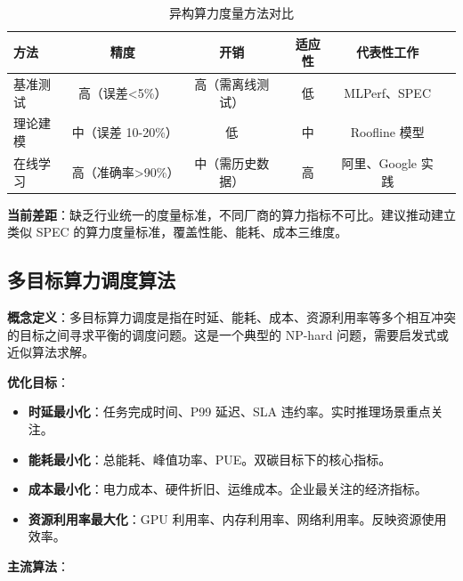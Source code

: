 \documentclass[12pt,a4paper]{article}
\begin{document}
\begin{table}[h]
\centering
\caption{异构算力度量方法对比}
\label{tab:compute-metrics}
\begin{tabular}{@{}lccccc@{}}
\toprule
\textbf{方法} & \textbf{精度} & \textbf{开销} & \textbf{适应性} & \textbf{代表性工作} \\
\midrule
基准测试 & 高（误差<5\%） & 高（需离线测试） & 低 & MLPerf、SPEC \\
理论建模 & 中（误差 10-20\%） & 低 & 中 & Roofline 模型 \\
在线学习 & 高（准确率>90\%） & 中（需历史数据） & 高 & 阿里、Google 实践 \\
\bottomrule
\end{tabular}
\end{table}

\textbf{当前差距}：缺乏行业统一的度量标准，不同厂商的算力指标不可比。建议推动建立类似 SPEC 的算力度量标准，覆盖性能、能耗、成本三维度。

\subsection{多目标算力调度算法}

\textbf{概念定义}：多目标算力调度是指在时延、能耗、成本、资源利用率等多个相互冲突的目标之间寻求平衡的调度问题。这是一个典型的 NP-hard 问题，需要启发式或近似算法求解\cite{gao2023energy}。

\textbf{优化目标}：

\begin{itemize}
    \item \textbf{时延最小化}：任务完成时间、P99 延迟、SLA 违约率。实时推理场景重点关注。
    \item \textbf{能耗最小化}：总能耗、峰值功率、PUE。双碳目标下的核心指标。
    \item \textbf{成本最小化}：电力成本、硬件折旧、运维成本。企业最关注的经济指标。
    \item \textbf{资源利用率最大化}：GPU 利用率、内存利用率、网络利用率。反映资源使用效率。
\end{itemize}

\textbf{主流算法}：
\end{document}
